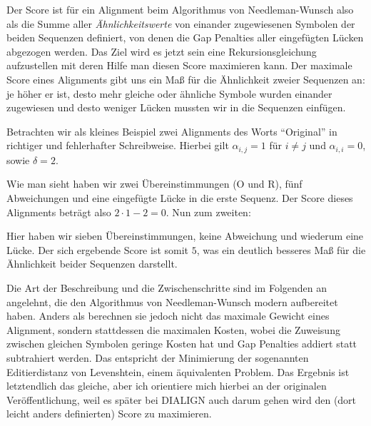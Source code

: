 Der Score ist für ein Alignment beim Algorithmus von Needleman-Wunsch also als die Summe aller \emph{Ähnlichkeitswerte} von einander zugewiesenen Symbolen der beiden Sequenzen definiert, von denen die Gap Penalties aller eingefügten Lücken abgezogen werden. Das Ziel wird es jetzt sein eine Rekursionsgleichung aufzustellen mit deren Hilfe man diesen Score maximieren kann. Der maximale Score eines Alignments gibt uns ein Maß für die Ähnlichkeit zweier Sequenzen an: je höher er ist, desto mehr gleiche oder ähnliche Symbole wurden einander zugewiesen und desto weniger Lücken mussten wir in die Sequenzen einfügen.

\begin{beispiel}
	Betrachten wir als kleines Beispiel zwei Alignments des Worts \enquote{Original} in richtiger und fehlerhafter Schreibweise. Hierbei gilt $\alpha_{i,j} = 1$ für $i \neq j$ und $\alpha_{i,i} = 0$, sowie $\delta = 2$.
	
	\footnotesize
	\begin{center}
	\end{center}
	\normalsize
	
	Wie man sieht haben wir zwei Übereinstimmungen (O und R), fünf Abweichungen und eine eingefügte Lücke in die erste Sequenz. Der Score dieses Alignments beträgt also $2\cdot 1 - 2 = 0$. Nun zum zweiten:
	
	\footnotesize
	\begin{center}
	\end{center}
	\normalsize
	
	Hier haben wir sieben Übereinstimmungen, keine Abweichung und wiederum eine Lücke. Der sich ergebende Score ist somit $5$, was ein deutlich besseres Maß für die Ähnlichkeit beider Sequenzen darstellt.
\end{beispiel}

Die Art der Beschreibung und die Zwischenschritte  sind im Folgenden an \cite{kt05} angelehnt, die den Algorithmus von Needleman-Wunsch modern aufbereitet haben. Anders als \cite{nw70} berechnen sie jedoch nicht das maximale Gewicht eines Alignment, sondern stattdessen die maximalen Kosten, wobei die Zuweisung zwischen gleichen Symbolen geringe Kosten hat und Gap Penalties addiert statt subtrahiert werden. Das entspricht der Minimierung der sogenannten Editierdistanz von Levenshtein, einem äquivalenten Problem. Das Ergebnis ist letztendlich das gleiche, aber ich orientiere mich hierbei an der originalen Veröffentlichung, weil es später bei DIALIGN auch darum gehen wird den (dort leicht anders definierten) Score zu maximieren.

